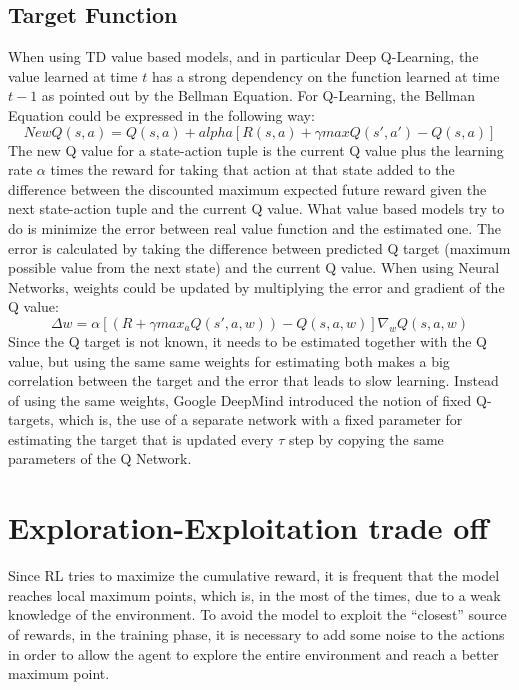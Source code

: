 \documentclass[Lau,oneside,noexaminfo]{sapthesis} %
\begin{document}
\subsection{Target Function}
When using TD value based models, and in particular Deep Q-Learning, the value learned at time $t$ has a strong dependency on the function learned at time $t-1$ as pointed out by the Bellman Equation. \newline
For Q-Learning, the Bellman Equation could be expressed in the following way:
\begin{equation}
NewQ( s,a ) = Q( s,a ) + alpha [ R(s,a) + \gamma maxQ(s',a') - Q(s,a) ]
\end{equation}
The new Q value for a state-action tuple is the current Q value plus the learning rate $\alpha$ times the reward for taking that action at that state added to the difference between the discounted  maximum expected future reward given the next state-action tuple and the current Q value. \newline
What value based models try to do is minimize the error between real value function and the estimated one. The error is calculated by taking the difference between predicted Q target (maximum possible value from the next state) and the current Q value. When using Neural Networks, weights could be updated by multiplying the error and gradient of the Q value:
\begin{equation}
\Delta w = \alpha [ (R + \gamma max_a Q(s',a,w)) - Q(s,a,w)] \nabla_w Q( s,a,w )
\end{equation}
Since the Q target is not known, it needs to be estimated together with the Q value, but using the same same weights for estimating both makes a big correlation between the target and the error that leads to slow learning. \newline
Instead of using the same weights, Google DeepMind introduced the notion of fixed Q-targets, which is, the use of a separate network with a fixed parameter for estimating the target that is updated every $\tau$ step by copying the same parameters of the Q Network.
\section{Exploration-Exploitation trade off}
Since RL tries to maximize the cumulative reward, it is frequent that the model reaches local maximum points, which is, in the most of the times, due to a weak knowledge of the environment.\newline
To avoid the model to exploit the “closest” source of rewards, in the training phase, it is necessary to add some noise to the actions in order to allow the agent to explore the entire environment and reach a better maximum point.
\end{document}
